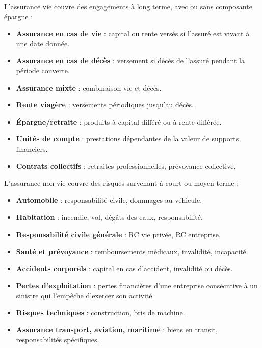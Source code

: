 \begin{f}
	
	L’assurance vie couvre des engagements à long terme, avec ou sans composante épargne :
	\begin{itemize}[nosep]
		\item \textbf{Assurance en cas de vie} : capital ou rente versés si l’assuré est vivant à une date donnée.
		\item \textbf{Assurance en cas de décès} : versement si décès de l’assuré pendant la période couverte.
		\item \textbf{Assurance mixte} : combinaison vie et décès.
		\item \textbf{Rente viagère} : versements périodiques jusqu’au décès.
		\item \textbf{Épargne/retraite} : produits à capital différé ou à rente différée.
		\item \textbf{Unités de compte} : prestations dépendantes de la valeur de supports financiers.
		\item \textbf{Contrats collectifs} : retraites professionnelles, prévoyance collective.
	\end{itemize}
	
	
	L’assurance non-vie couvre des risques survenant à court ou moyen terme :
	\begin{itemize}[nosep]
		\item \textbf{Automobile} : responsabilité civile, dommages au véhicule.
		\item \textbf{Habitation} : incendie, vol, dégâts des eaux, responsabilité.
		\item \textbf{Responsabilité civile générale} : RC vie privée, RC entreprise.
		\item \textbf{Santé et prévoyance} : remboursements médicaux, invalidité, incapacité.
		\item \textbf{Accidents corporels} : capital en cas d’accident, invalidité ou décès.
		\item \textbf{Pertes d’exploitation} : pertes financières d'une entreprise consécutive à un sinistre qui l'empêche d'exercer son activité.
		\item \textbf{Risques techniques} : construction, bris de machine.
		\item \textbf{Assurance transport, aviation, maritime} : biens en transit, responsabilités spécifiques.
	\end{itemize}
	

\end{f}
